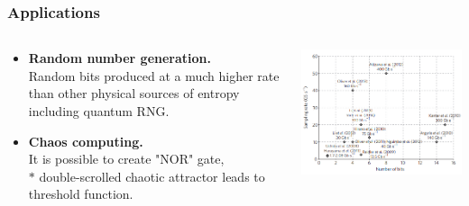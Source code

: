 


\begin{frame}
\frametitle{Applications}
\begin{columns}
\begin{column}{0.5\linewidth}       
\begin{itemize}
\item \textbf{Random number generation.}    \\
Random bits produced at a much higher rate than other physical sources of entropy including quantum RNG.    
\item \textbf{Chaos computing.} \\
It is possible to create "NOR" gate, \\
$\ast$ double-scrolled chaotic attractor leads to threshold function. 
\end{itemize}
\end{column}
\begin{column}{0.5\linewidth}
    \includegraphics[width=\linewidth]{images/ChaosRNG.png}
\end{column}
\end{columns}
\end{frame}